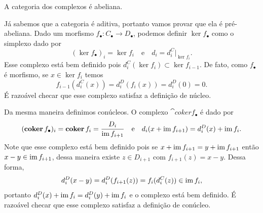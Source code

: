 \begin{lema}
    A categoria dos complexos é abeliana.
\end{lema}
\begin{demolema}
    Já sabemos que a categoria é aditiva, portanto vamos provar que ela é pré-abeliana. Dado um morfismo $f_\bullet \colon C_\bullet \to D_\bullet$, podemos definir $\ker f_\bullet$ como o simplexo dado por \begin{equation}
        (\ker f_\bullet)_i = \ker f_i \quad \text{e} \quad d_i = d^C_i|_{\ker f_i}.
    \end{equation} Esse complexo está bem definido pois $d^C_i(\ker f_i) \subset \ker f_{i - 1}$. De fato, como $f_\bullet$ é morfismo, se $x \in \ker f_i$ temos \begin{equation}
        f_{i-1}(d^C_i(x)) = d^D_i(f_i(x)) = d^D_i(0) = 0.
    \end{equation} É razoável checar que esse complexo satisfaz a definição de núcleo.

    Da mesma maneira definimos conúcleos. O complexo $\cat{coker} f_\bullet$ é dado por \begin{equation}
        (\operatorname{\mathbf{coker}} f_\bullet)_i = \operatorname{\mathbf{coker}} f_i = \frac{D_i}{\operatorname{im} f_{i+1}} \quad \text{e} \quad d_i(x + \operatorname{im} f_{i+1}) = d^D_i(x) + \operatorname{im} f_i.
    \end{equation} Note que esse complexo está bem definido pois se $x + \operatorname{im} f_{i + 1} = y + \operatorname{im} f_{i + 1}$ então $x - y \in \operatorname{im} f_{i + 1}$, dessa maneira existe $z \in D_{i + 1}$ com $f_{i+1}(z) = x - y$. Dessa forma, \begin{equation}
        d^D_i(x - y) = d^D_i(f_{i + 1}(z)) = f_i(d^C_i(z)) \in \operatorname{im} f_i,
    \end{equation} portanto $d^D_i(x) + \operatorname{im} f_i = d^D_i(y) + \operatorname{im} f_i$ e o complexo está bem definido. É razoável checar que esse complexo satisfaz a definição de conúcleo.
\end{demolema}